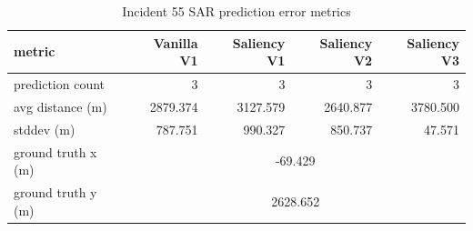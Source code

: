 \begin{table}[ht]
\centering
\caption{Incident 55 SAR prediction error metrics}
\label{tab:sar-incident-55}
\begin{tabular}{lrrrr}
\hline
metric & Vanilla V1 & Saliency V1 & Saliency V2 & Saliency V3 \\
\hline
prediction count & 3 & 3 & 3 & 3 \\
avg distance (m) & 2879.374 & 3127.579 & 2640.877 & 3780.500 \\
stddev (m) & 787.751 & 990.327 & 850.737 & 47.571 \\
ground truth x (m) & \multicolumn{4}{c}{-69.429} \\
ground truth y (m) & \multicolumn{4}{c}{2628.652} \\
\hline
\end{tabular}
\end{table}
